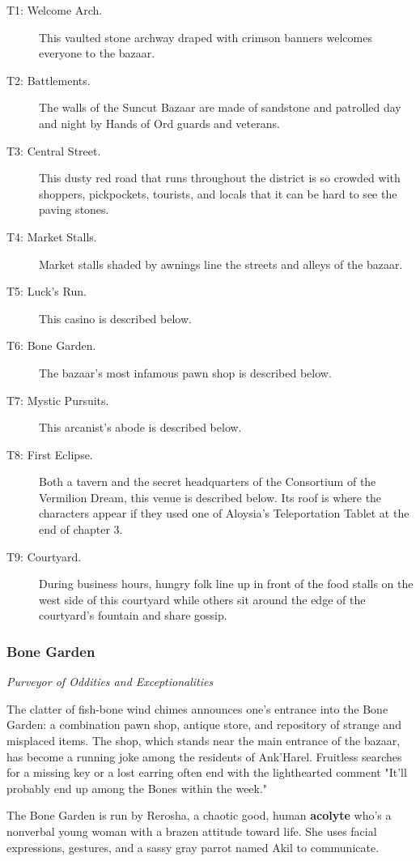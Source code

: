 \documentclass[10pt,a4paper,twoside,bg=print,twocolumn,openany,nodeprecatedcode]{dndbook}
\begin{document}
\begin{description}
\item[T1: Welcome Arch.]
This vaulted stone archway draped with crimson banners welcomes everyone to the bazaar.
\item[T2: Battlements.]
The walls of the Suncut Bazaar are made of sandstone and patrolled day and night by Hands of Ord guards and veterans.
\item[T3: Central Street.]
This dusty red road that runs throughout the district is so crowded with shoppers, pickpockets, tourists, and locals that it can be hard to see the paving stones.
\item[T4: Market Stalls.]
Market stalls shaded by awnings line the streets and alleys of the bazaar.
\item[T5: Luck's Run.]
This casino is described below.
\item[T6: Bone Garden.]
The bazaar's most infamous pawn shop is described below.
\item[T7: Mystic Pursuits.]
This arcanist's abode is described below.
\item[T8: First Eclipse.]
Both a tavern and the secret headquarters of the Consortium of the Vermilion Dream, this venue is described below. Its roof is where the characters appear if they used one of Aloysia's Teleportation Tablet at the end of chapter 3.
\item[T9: Courtyard.]
During business hours, hungry folk line up in front of the food stalls on the west side of this courtyard while others sit around the edge of the courtyard's fountain and share gossip.
\end{description}

\subsubsection{Bone Garden}
\textit{Purveyor of Oddities and Exceptionalities}

The clatter of fish-bone wind chimes announces one's entrance into the Bone Garden: a combination pawn shop, antique store, and repository of strange and misplaced items. The shop, which stands near the main entrance of the bazaar, has become a running joke among the residents of Ank'Harel. Fruitless searches for a missing key or a lost earring often end with the lighthearted comment "It'll probably end up among the Bones within the week."

The Bone Garden is run by Rerosha, a chaotic good, human \textbf{acolyte} who's a nonverbal young woman with a brazen attitude toward life. She uses facial expressions, gestures, and a sassy gray parrot named Akil to communicate.
\end{document}
